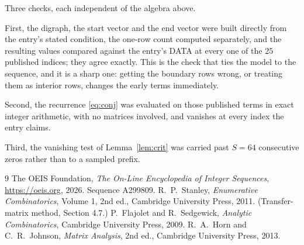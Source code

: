 \documentclass[11pt,a4paper]{article}
\theoremstyle{plain}
\theoremstyle{definition}
\begin{document}
Three checks, each independent of the algebra above.

First, the digraph, the start vector and the end vector were built directly from the
entry's stated condition, the one-row count computed separately, and the resulting values
compared against the entry's DATA at every one of the $25$ published indices; they
agree exactly. This is the check that ties the model to the sequence, and it is a sharp one:
getting the boundary rows wrong, or treating them as interior rows, changes the early terms
immediately.

Second, the recurrence \eqref{eq:conj} was evaluated on those published terms in exact
integer arithmetic, with no matrices involved, and vanishes at every index the entry claims.

Third, the vanishing test of Lemma~\ref{lem:crit} was carried past $S=64$ consecutive
zeros rather than to a sampled prefix.

\begin{thebibliography}{9}
 The OEIS Foundation, \emph{The On-Line Encyclopedia of Integer
Sequences}, \url{https://oeis.org}, 2026. Sequence A299809.
 R.~P.~Stanley, \emph{Enumerative Combinatorics}, Volume 1, 2nd ed.,
Cambridge University Press, 2011. (Transfer-matrix method, Section 4.7.)
 P.~Flajolet and R.~Sedgewick, \emph{Analytic Combinatorics}, Cambridge
University Press, 2009.
 R.~A.~Horn and C.~R.~Johnson, \emph{Matrix Analysis}, 2nd ed., Cambridge
University Press, 2013.
\end{thebibliography}
\end{document}
